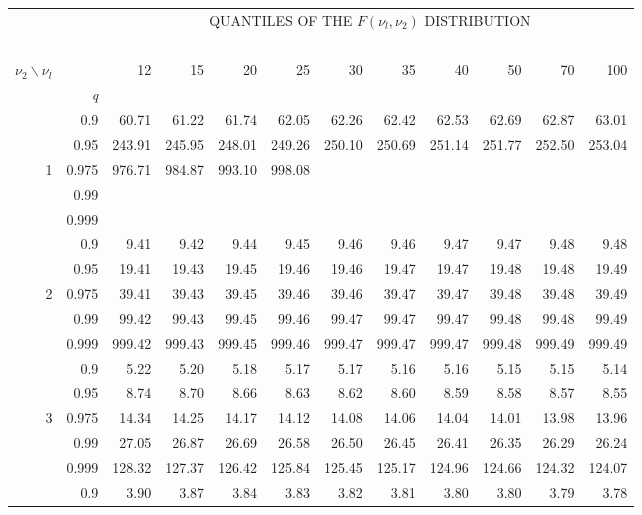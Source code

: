 \documentclass[12pt,a4paper,openany,twoside]{report}
\theoremstyle{definition}
\theoremstyle{remark}
\theoremstyle{plain}
\theoremstyle{definition}
\theoremstyle{definition}
\theoremstyle{definition}
\theoremstyle{remark}
\begin{document}
\newpage

\begin{center}
\begin{tabular}{rr@{\ }r@{\ }r@{\ }r@{\ }r@{\ }r@{\ }r@{\ }r@{\ }r@{\ }r@{\ }r}
& &\multicolumn{10}{c}{QUANTILES OF THE $F(\nu_l, \nu_2)$ DISTRIBUTION}\\
\ \\
 $\nu_2\backslash\nu_l$ & & 12 & 15 & 20 & 25 & 30 & 35 & 40 & 50 & 70 & 100\\
 & \textit{q}  &  &  &  &  &  &  &  &  & & \\
 \rule{0pt}{2.5ex} & 0.9 & 60.71 & 61.22 & 61.74 & 62.05 & 62.26 & 62.42 & 62.53 & 62.69 & 62.87 & 63.01\\
 & 0.95 & 243.91 & 245.95 & 248.01 & 249.26 & 250.10 & 250.69 & 251.14 & 251.77 & 252.50 & 253.04\\
1 & 0.975 & 976.71 & 984.87 & 993.10 & 998.08 &   &   &   &   &  &  \\
 & 0.99  &   &  &   &  &  &  &   &  &\\
 & 0.999  &   &  &   &  &  &  &   &  & \\
\rule{0pt}{2.5ex} & 0.9 & 9.41 & 9.42 & 9.44 & 9.45 & 9.46 & 9.46 & 9.47 & 9.47 & 9.48 & 9.48\\
 & 0.95 & 19.41 & 19.43 & 19.45 & 19.46 & 19.46 & 19.47 & 19.47 & 19.48 & 19.48 & 19.49\\
2 & 0.975 & 39.41 & 39.43 & 39.45 & 39.46 & 39.46 & 39.47 & 39.47 & 39.48 & 39.48 & 39.49\\
 & 0.99 & 99.42 & 99.43 & 99.45 & 99.46 & 99.47 & 99.47 & 99.47 & 99.48 & 99.48 & 99.49\\
 & 0.999 & 999.42 & 999.43 & 999.45 & 999.46 & 999.47 & 999.47 & 999.47 & 999.48 & 999.49 & 999.49\\
\rule{0pt}{2.5ex} & 0.9 & 5.22 & 5.20 & 5.18 & 5.17 & 5.17 & 5.16 & 5.16 & 5.15 & 5.15 & 5.14\\
 & 0.95 & 8.74 & 8.70 & 8.66 & 8.63 & 8.62 & 8.60 & 8.59 & 8.58 & 8.57 & 8.55\\
3 & 0.975 & 14.34 & 14.25 & 14.17 & 14.12 & 14.08 & 14.06 & 14.04 & 14.01 & 13.98 & 13.96\\
 & 0.99 & 27.05 & 26.87 & 26.69 & 26.58 & 26.50 & 26.45 & 26.41 & 26.35 & 26.29 & 26.24\\
 & 0.999 & 128.32 & 127.37 & 126.42 & 125.84 & 125.45 & 125.17 & 124.96 & 124.66 & 124.32 & 124.07\\
\rule{0pt}{2.5ex} & 0.9 & 3.90 & 3.87 & 3.84 & 3.83 & 3.82 & 3.81 & 3.80 & 3.80 & 3.79 & 3.78\\

\end{tabular}
\end{center}
\end{document}
